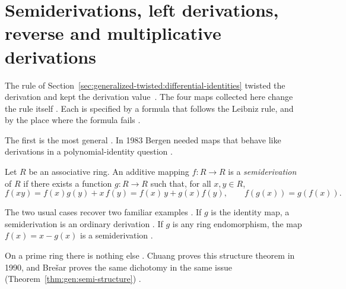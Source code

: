 \section{Semiderivations, left derivations, reverse and multiplicative derivations}\label{sec:generalized-twisted:semi-left-reverse}

The rule of Section~\ref{sec:generalized-twisted:differential-identities}
twisted the derivation and kept the derivation value~\cite[p.~1105]{Herstein1957}. The four maps collected
here change the rule itself \cite[p.~267]{Bergen1983}. Each is specified by a
formula that follows the Leibniz rule, and by the place where the formula
fails \cite[p.~1105]{Herstein1957}.

The first is the most general \cite[p.~267]{Bergen1983}. In 1983 Bergen needed
maps that behave like derivations in a polynomial-identity question
\cite[p.~267]{Bergen1983}.

\begin{definition}\label{def:gen:semiderivation}
Let $R$ be an associative ring. An additive mapping $f\colon R\to R$ is a
\emph{semiderivation} of $R$ if there exists a function $g\colon R\to R$ such
that, for all $x,y\in R$,
\begin{equation*}
f(xy)=f(x)g(y)+x\,f(y)=f(x)\,y+g(x)f(y),
\qquad
f(g(x))=g(f(x)).
\end{equation*}
\end{definition}

The two usual cases recover two familiar examples
\cite[p.~867]{Chuang1990Semi}. If $g$ is the identity map, a semiderivation is
an ordinary derivation \cite[p.~867]{Chuang1990Semi}. If $g$ is any ring
endomorphism, the map $f(x)=x-g(x)$ is a semiderivation
\cite[p.~867]{Chuang1990Semi}.

On a prime ring there is nothing else \cite[p.~867]{Chuang1990Semi}. Chuang
proves this structure theorem in 1990, and Bre\v{s}ar proves the same
dichotomy in the same issue (Theorem~\ref{thm:gen:semi-structure})
\cite[p.~859]{Bresar1990Semi}.

